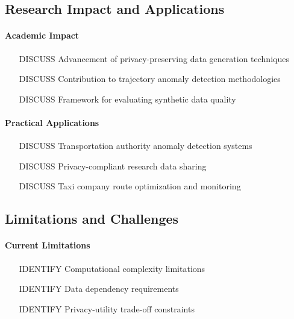 \documentclass[runningheads]{llncs}
\begin{document}
\subsection{Research Impact and Applications}

\paragraph{Academic Impact}
\begin{itemize}
\item [DISCUSS] Advancement of privacy-preserving data generation techniques
\item [DISCUSS] Contribution to trajectory anomaly detection methodologies
\item [DISCUSS] Framework for evaluating synthetic data quality
\end{itemize}

\paragraph{Practical Applications}
\begin{itemize}
\item [DISCUSS] Transportation authority anomaly detection systems
\item [DISCUSS] Privacy-compliant research data sharing
\item [DISCUSS] Taxi company route optimization and monitoring
\end{itemize}

\subsection{Limitations and Challenges}

\paragraph{Current Limitations}
\begin{itemize}
\item [IDENTIFY] Computational complexity limitations
\item [IDENTIFY] Data dependency requirements
\item [IDENTIFY] Privacy-utility trade-off constraints
\end{itemize}
\end{document}
